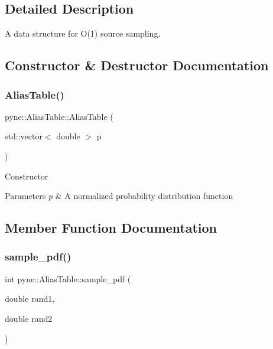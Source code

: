 \subsection{Detailed Description}
A data structure for O(1) source sampling. 

\subsection{Constructor \& Destructor Documentation}
\mbox{\label{classpyne_1_1_alias_table_a18d70805153a53fcf0a337d77931bd19}} 
\subsubsection{\texorpdfstring{Alias\+Table()}{AliasTable()}}
{\footnotesize\ttfamily pyne\+::\+Alias\+Table\+::\+Alias\+Table (\begin{DoxyParamCaption}\item[{std\+::vector$<$ double $>$}]{p }\end{DoxyParamCaption})}

Constructor 
\begin{DoxyParams}{Parameters}
{\em p} & A normalized probability distribution function \\
\hline
\end{DoxyParams}


\subsection{Member Function Documentation}
\mbox{\label{classpyne_1_1_alias_table_ab59ea369654d8304d27e1abcfa74eef4}} 
\subsubsection{\texorpdfstring{sample\+\_\+pdf()}{sample\_pdf()}}
{\footnotesize\ttfamily int pyne\+::\+Alias\+Table\+::sample\+\_\+pdf (\begin{DoxyParamCaption}\item[{double}]{rand1,  }\item[{double}]{rand2 }\end{DoxyParamCaption})}

